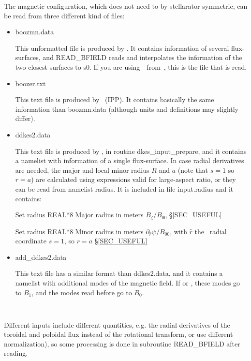 The magnetic configuration, which does not need to by stellarator-symmetric, can be read from three different kind of files:

\begin{itemize}

\item {\ttfamily boozmn.data}

  This unformatted file is produced by \BOOZERXFORM. It contains information of several flux-surfaces, and {\ttfamily READ\_BFIELD} reads and interpolates the information of the two closest surfaces to {\ttfamily s0}. If you are using~\KNOSOS~from~\TASKTD, this is the file that is read.

 

\item {\ttfamily boozer.txt}

This text file is produced by \COTRANS~(IPP). It contains basically the same information than {\ttfamily boozmn.data} (although units and definitions may slightly differ).

\item {\ttfamily ddkes2.data}

This text file is produced by \DKES, in routine {\ttfamily dkes\_input\_prepare}, and it contains a namelist with information of a single flux-surface. In case radial derivatives are needed, the major and local minor radius $R$ and $a$ (note that $s=1$ so $r=a$) are calculated using expressions valid for large-aspect ratio, or they can be read from namelist {\ttfamily radius}. It is included in file {\ttfamily input.radius} and it contains:

{Set radius}
{REAL*8}
{Major radius in meters}
{$B_\zeta/B_{00}$}
{\S\ref{SEC_USEFUL}}

{Set radius}
{REAL*8}
{Minor radius in meters}
{$\partial_{\hat{r}}\psi/B_{00}$, with $\hat{r}$ the \DKES~radial coordinate}
{$s=1$, so $r=a$}
{\S\ref{SEC_USEFUL}}

\item {\ttfamily add\_ddkes2.data}

This text file has a similar format than {\ttfamily ddkes2.data}, and it contains a namelist with additional modes of the magnetic field. If  or , these modes go to $B_1$, and the modes read before go to $B_0$.

\end{itemize}

\

Different inputs include different quantities, e.g. the radial derivatives of the toroidal and poloidal flux instead of the rotational transform, or use different normalization), so some processing is done in subroutine {\ttfamily READ\_BFIELD} after reading.




